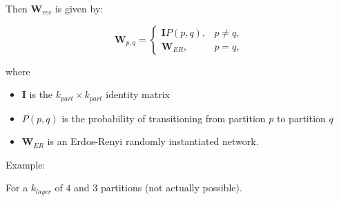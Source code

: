     Then $\mathbf{W}_{rec}$ is given by:

    \[
    \mathbf{W}_{p,q} =
    \begin{cases}
    \mathbf{I} P(p,q), & p \neq q, \\
    \mathbf{W}_{ER}, & p = q,
    \end{cases}
    \]

    where 
    \begin{itemize}
        \item \(\mathbf{I}\) is the \( k_{part} \times k_{part} \) identity matrix
        \item \( P(p,q) \) is the probability of transitioning from partition \( p \) to partition \( q \)
        \item $\mathbf{W}_{ER}$ is an Erdos-Renyi randomly instantiated network.
    \end{itemize}
    








    Example:

    For a $k_{layer}$ of $4$ and $3$ partitions (not actually possible).

